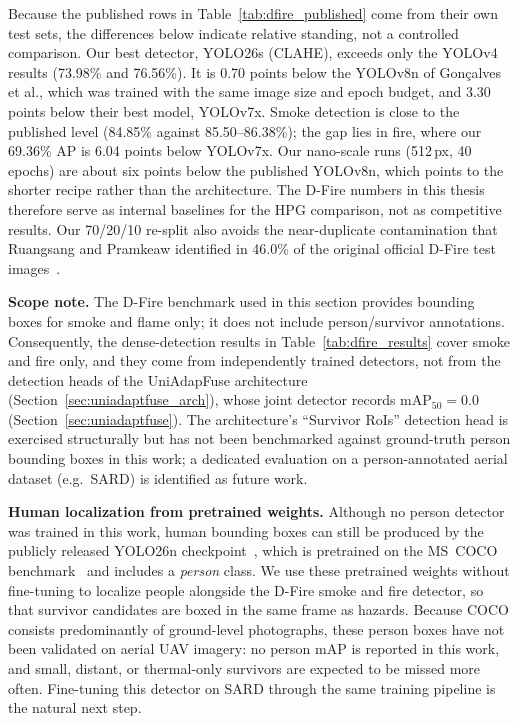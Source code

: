 \documentclass[journal]{IEEEtran}
\begin{document}
Because the published rows in Table~\ref{tab:dfire_published} come from their own test sets, the differences below indicate relative standing, not a controlled comparison. Our best detector, YOLO26s (CLAHE), exceeds only the YOLOv4 results (73.98\% and 76.56\%). It is 0.70 points below the YOLOv8n of Gon{\c{c}}alves et al., which was trained with the same image size and epoch budget, and 3.30 points below their best model, YOLOv7x. Smoke detection is close to the published level (84.85\% against 85.50--86.38\%); the gap lies in fire, where our 69.36\% AP is 6.04 points below YOLOv7x. Our nano-scale runs (512\,px, 40 epochs) are about six points below the published YOLOv8n, which points to the shorter recipe rather than the architecture. The D-Fire numbers in this thesis therefore serve as internal baselines for the HPG comparison, not as competitive results. Our 70/20/10 re-split also avoids the near-duplicate contamination that Ruangsang and Pramkeaw identified in 46.0\% of the original official D-Fire test images~\cite{ruangsang2026crossdataset}.

\textbf{Scope note.} The D-Fire benchmark used in this section provides bounding boxes for smoke and flame only; it does not include person/survivor annotations. Consequently, the dense-detection results in Table~\ref{tab:dfire_results} cover smoke and fire only, and they come from independently trained detectors, not from the detection heads of the UniAdapFuse architecture (Section~\ref{sec:uniadaptfuse_arch}), whose joint detector records $\mathrm{mAP}_{50}=0.0$ (Section~\ref{sec:uniadaptfuse}). The architecture's ``Survivor RoIs'' detection head is exercised structurally but has not been benchmarked against ground-truth person bounding boxes in this work; a dedicated evaluation on a person-annotated aerial dataset (e.g.\ SARD) is identified as future work.

\textbf{Human localization from pretrained weights.} Although no person detector was trained in this work, human bounding boxes can still be produced by the publicly released YOLO26n checkpoint~\cite{sapkota2025yolo26}, which is pretrained on the MS~COCO benchmark~\cite{lin2014coco} and includes a \textit{person} class. We use these pretrained weights without fine-tuning to localize people alongside the D-Fire smoke and fire detector, so that survivor candidates are boxed in the same frame as hazards. Because COCO consists predominantly of ground-level photographs, these person boxes have not been validated on aerial UAV imagery: no person mAP is reported in this work, and small, distant, or thermal-only survivors are expected to be missed more often. Fine-tuning this detector on SARD through the same training pipeline is the natural next step.
\end{document}
